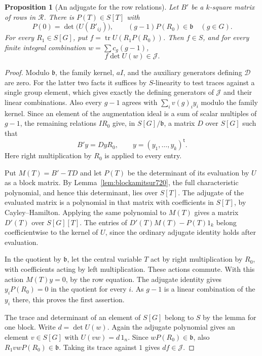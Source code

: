 \documentclass[a4paper,11pt]{article}
\newtheorem{proposition}{Proposition}[section]
\theoremstyle{definition}
\theoremstyle{remark}
\numberwithin{equation}{section}
\begin{document}
\begin{proposition}[An adjugate for the row relations]
\leavevmode\label{prop:ribetadj720}
Let \(B'\) be a \(k\)-square matrix of rows in \(\mathcal R\).
There is \(P(T)\in S[T]\) with
\[
        P(0)=\det\bigl(U(B'_{ij})\bigr),\qquad
        (g-1)P(R_0)\in\mathfrak b\quad(g\in G).
\]
For every \(R_1\in S[G]\), put
\(f=\operatorname{tr}U(R_1P(R_0))\). Then \(f\in S\), and for
every finite integral combination \(w=\sum c_g(g-1)\),
\[
                     f\det U(w)\in\mathcal J .
\]
\end{proposition}
\begin{proof}
Modulo \(\mathfrak b\), the family kernel, \(a I\), and the
auxiliary generators defining \(\mathcal D\) are zero. For
the latter two facts it suffices by \(S\)-linearity to test
traces against a single group element, which gives exactly
the defining generators of \(\mathcal J\) and their linear
combinations. Also every \(g-1\) agrees with
\(\sum_i v(g)_iy_i\) modulo the family kernel. Since an
element of the augmentation ideal is a sum of scalar multiples
of \(g-1\), the remaining relations \(I R_0\) give, in
\(S[G]/\mathfrak b\), a matrix \(D\) over \(S[G]\) such that
\[
                     B' y=D y R_0 ,
              \qquad y=(y_1,\ldots,y_k)^{\mathsf t}.
\]
Here right multiplication by \(R_0\) is applied to every entry.

Put \(M(T)=B'-TD\) and let \(P(T)\) be the determinant of
its evaluation by \(U\) as a block matrix. By
Lemma~\ref{lem:blockamitsur720}, the full characteristic
polynomial, and hence this determinant, lies over \(S[T]\).
The adjugate of the evaluated matrix is a polynomial in
that matrix with coefficients in \(S[T]\), by Cayley--Hamilton.
Applying the same polynomial to \(M(T)\) gives a matrix \(D'(T)\)
over \(S[G][T]\). The entries of
\(D'(T)M(T)-P(T)1_k\) belong coefficientwise to the kernel of
\(U\), since the ordinary adjugate identity holds after evaluation.

In the quotient by \(\mathfrak b\), let the central variable \(T\)
act by right multiplication by \(R_0\), with coefficients acting
by left multiplication. These actions commute. With this action
\(M(T)y=0\), by the row equation. The adjugate identity gives
\(y_iP(R_0)=0\) in the quotient for every \(i\). As
\(g-1\) is a linear combination of the \(y_i\) there, this
proves the first assertion.

The trace and determinant of an element of \(S[G]\) belong to
\(S\) by the lemma for one block. Write \(d=\det U(w)\).
Again the adjugate polynomial gives an element \(v\in S[G]\)
with \(U(vw)=d\,1_n\). Since \(wP(R_0)\in\mathfrak b\), also
\(R_1vwP(R_0)\in\mathfrak b\). Taking its trace against \(1\)
gives \(df\in\mathcal J\).
\end{proof}
\end{document}
